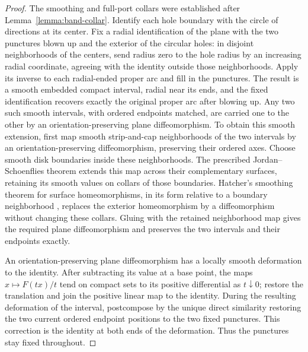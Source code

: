 \begin{proof}
The smoothing and full-port collars were established after
Lemma~\ref{lemma:band-collar}.  Identify each hole boundary with the
circle of directions at its center.  Fix a radial identification of the
plane with the two punctures blown up and the exterior of the circular
holes: in disjoint neighborhoods of the centers, send radius zero to the
hole radius by an increasing radial coordinate, agreeing with the
identity outside those neighborhoods.  Apply its inverse to each
radial-ended proper arc and fill in the punctures.  The result is a
smooth embedded compact interval, radial near its ends, and the fixed
identification recovers exactly the original proper arc after blowing
up.  Any two such smooth intervals, with ordered endpoints
matched, are carried one to the other by an orientation-preserving plane
diffeomorphism. To obtain this smooth extension, first map smooth
strip-and-cap neighborhoods of the two intervals by an
orientation-preserving diffeomorphism, preserving their ordered axes.
Choose smooth disk boundaries inside these neighborhoods. The prescribed
Jordan--Schoenflies theorem extends this map across their complementary
surfaces, retaining its smooth values on collars of those boundaries.
Hatcher's smoothing theorem for surface homeomorphisms, in its form
relative to a boundary neighborhood
\cite[Theorem~B and the following refinement, p.~2]{Hatcher2025},
replaces the exterior homeomorphism by a diffeomorphism without changing
these collars. Gluing with the retained neighborhood map gives the
required plane diffeomorphism and preserves the two intervals and their
endpoints exactly.

An orientation-preserving plane diffeomorphism has a locally smooth
deformation to the identity.  After subtracting its value at a base
point, the maps $x\mapsto F(tx)/t$ tend on compact sets to its positive
differential as $t\downarrow0$; restore the translation and join the
positive linear map to the identity.  During the resulting deformation
of the interval, postcompose by the unique direct similarity restoring
the two current ordered endpoint positions to the two fixed punctures.
This correction is the identity at both ends of the deformation.
Thus the punctures stay fixed throughout.


\end{proof}
